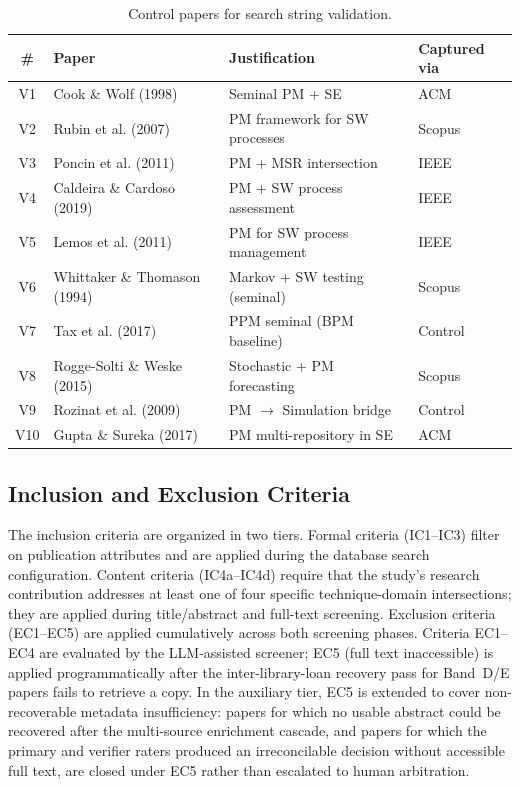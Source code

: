\begin{table}[htbp]
\centering
\caption{Control papers for search string validation.}
\label{tab:validation-set}
\small
\setlength{\tabcolsep}{4pt}
\begin{tabular}{c p{4.5cm} p{4.1cm} p{1.6cm}}
\toprule
\textbf{\#} & \textbf{Paper} & \textbf{Justification} & \textbf{Captured via} \\
\midrule
V1  & Cook \& Wolf (1998)            & Seminal PM + SE                    & ACM \\
V2  & Rubin et al. (2007)            & PM framework for SW processes      & Scopus \\
V3  & Poncin et al. (2011)           & PM + MSR intersection              & IEEE \\
V4  & Caldeira \& Cardoso (2019)     & PM + SW process assessment         & IEEE \\
V5  & Lemos et al. (2011)            & PM for SW process management       & IEEE \\
V6  & Whittaker \& Thomason (1994)   & Markov + SW testing (seminal)      & Scopus \\
V7  & Tax et al. (2017)              & PPM seminal (BPM baseline)         & Control \\
V8  & Rogge-Solti \& Weske (2015)    & Stochastic + PM forecasting        & Scopus \\
V9  & Rozinat et al. (2009)          & PM $\rightarrow$ Simulation bridge & Control \\
V10 & Gupta \& Sureka (2017)         & PM multi-repository in SE          & ACM \\
\bottomrule
\end{tabular}
\end{table}


\subsection{Inclusion and Exclusion Criteria}
\label{sec:slr-criteria}

The inclusion criteria are organized in two tiers. Formal criteria
(IC1--IC3) filter on publication attributes and are applied during the
database search configuration. Content criteria (IC4a--IC4d) require that the
study's research contribution addresses at least one of four specific
technique-domain intersections; they are applied during title/abstract and
full-text screening. Exclusion criteria (EC1--EC5) are applied cumulatively
across both screening phases. Criteria EC1--EC4 are evaluated by the
LLM-assisted screener; EC5 (full text inaccessible) is applied
programmatically after the inter-library-loan recovery pass for Band~D/E
papers fails to retrieve a copy. In the auxiliary tier, EC5 is extended to
cover non-recoverable metadata insufficiency: papers for which no usable
abstract could be recovered after the multi-source enrichment cascade, and
papers for which the primary and verifier raters produced an irreconcilable
decision without accessible full text, are closed under EC5 rather than
escalated to human arbitration.

